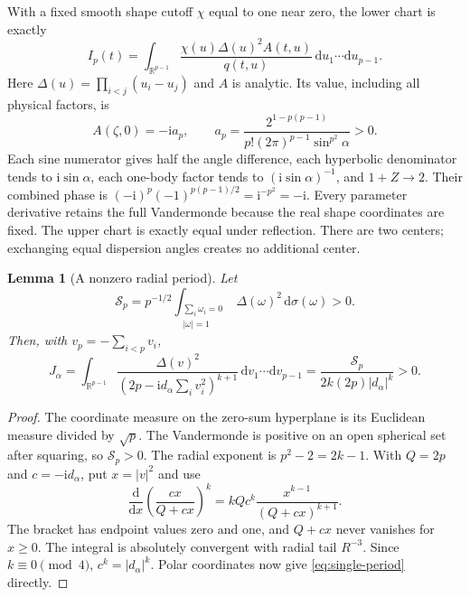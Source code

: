 \documentclass[11pt]{article}
\numberwithin{equation}{section}
\newtheorem{lemma}[theorem]{Lemma}
\theoremstyle{remark}\newtheorem{remark}[theorem]{Remark}
\newcommand{\ii}{\mathrm i}
\newcommand{\dd}{\mathrm d}
\begin{document}
With a fixed smooth shape cutoff $\chi$ equal to one near zero,
the lower chart is exactly
\begin{equation}\label{eq:angular-local-integral}
 I_p(t)=\int_{\mathbb R^{p-1}}
       \frac{\chi(u)\Delta(u)^2 A(t,u)}{q(t,u)}
                         \,\dd u_1\cdots\dd u_{p-1}.
\end{equation}
Here $\Delta(u)=\prod_{i<j}(u_i-u_j)$ and $A$ is analytic.
Its value, including all physical factors, is
\begin{equation}\label{eq:angular-local-prefactor}
 A(\zeta,0)=-\ii a_p,\qquad
 a_p=\frac{2^{1-p(p-1)}}{p!(2\pi)^{p-1}\sin^{p^2}\alpha}>0.
\end{equation}
Each sine numerator gives half the angle difference,
each hyperbolic denominator tends to $\ii\sin\alpha$,
each one-body factor tends to $(\ii\sin\alpha)^{-1}$,
and $1+Z\to2$. Their combined phase is
$(-\ii)^p(-1)^{p(p-1)/2}=\ii^{-p^2}=-\ii$.
Every parameter derivative retains the full Vandermonde
because the real shape coordinates are fixed.
The upper chart is exactly equal under reflection.
There are two centers; exchanging equal dispersion angles creates
no additional center.

\begin{lemma}[A nonzero radial period]\label{lem:single-period}
Let
\[
 \mathcal S_p=p^{-1/2}
       \int_{\substack{\sum_i\omega_i=0\\|\omega|=1}}
            \Delta(\omega)^2\,\dd\sigma(\omega)>0.
\]
Then, with $v_p=-\sum_{i<p}v_i$,
\begin{equation}\label{eq:single-period}
 J_\alpha=\int_{\mathbb R^{p-1}}
       \frac{\Delta(v)^2}{(2p-\ii d_\alpha\sum_i v_i^2)^{k+1}}
                \,\dd v_1\cdots\dd v_{p-1}
       =\frac{\mathcal S_p}{2k(2p)|d_\alpha|^k}>0.
\end{equation}
\end{lemma}
\begin{proof}
The coordinate measure on the zero-sum hyperplane is its
Euclidean measure divided by $\sqrt p$.
The Vandermonde is positive on an open spherical set after
squaring, so $\mathcal S_p>0$.
The radial exponent is $p^2-2=2k-1$.
With $Q=2p$ and $c=-\ii d_\alpha$, put $x=|v|^2$ and use
\[
 \frac{\dd}{\dd x}\left(\frac{cx}{Q+cx}\right)^k
       =kQc^k\frac{x^{k-1}}{(Q+cx)^{k+1}}.
\]
The bracket has endpoint values zero and one, and $Q+cx$ never
vanishes for $x\ge0$. The integral is absolutely convergent
with radial tail $R^{-3}$.
Since $k\equiv0\pmod4$, $c^k=|d_\alpha|^k$.
Polar coordinates now give \eqref{eq:single-period} directly.
\end{proof}
\end{document}

